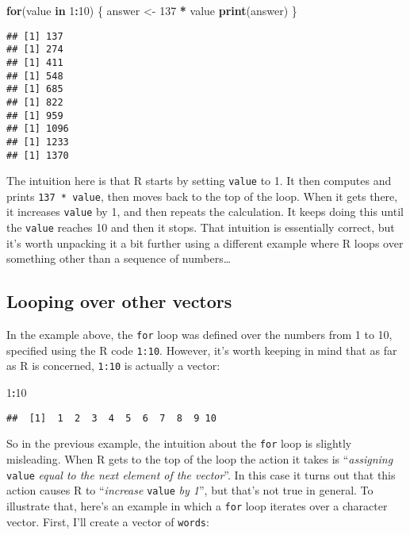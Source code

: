 \documentclass[]{book}
\newenvironment{Shaded}{\begin{snugshade}}{\end{snugshade}}
\newcommand{\ControlFlowTok}[1]{\textcolor[rgb]{0.13,0.29,0.53}{\textbf{#1}}}
\newcommand{\DecValTok}[1]{\textcolor[rgb]{0.00,0.00,0.81}{#1}}
\newcommand{\KeywordTok}[1]{\textcolor[rgb]{0.13,0.29,0.53}{\textbf{#1}}}
\newcommand{\NormalTok}[1]{#1}
\newcommand{\OperatorTok}[1]{\textcolor[rgb]{0.81,0.36,0.00}{\textbf{#1}}}
\newcommand{\StringTok}[1]{\textcolor[rgb]{0.31,0.60,0.02}{#1}}
\begin{document}
\begin{Shaded}
\begin{Highlighting}[]
\ControlFlowTok{for}\NormalTok{(value }\ControlFlowTok{in} \DecValTok{1}\OperatorTok{:}\DecValTok{10}\NormalTok{) \{}
\NormalTok{  answer <-}\StringTok{ }\DecValTok{137} \OperatorTok{*}\StringTok{ }\NormalTok{value}
  \KeywordTok{print}\NormalTok{(answer)}
\NormalTok{\}}
\end{Highlighting}
\end{Shaded}

\begin{verbatim}
## [1] 137
## [1] 274
## [1] 411
## [1] 548
## [1] 685
## [1] 822
## [1] 959
## [1] 1096
## [1] 1233
## [1] 1370
\end{verbatim}

The intuition here is that R starts by setting \texttt{value} to 1. It then computes and prints \texttt{137\ *\ value}, then moves back to the top of the loop. When it gets there, it increases \texttt{value} by 1, and then repeats the calculation. It keeps doing this until the \texttt{value} reaches 10 and then it stops. That intuition is essentially correct, but it's worth unpacking it a bit further using a different example where R loops over something other than a sequence of numbers\ldots{}

\hypertarget{looping-over-other-vectors}{%
\subsection{Looping over other vectors}\label{looping-over-other-vectors}}

In the example above, the \texttt{for} loop was defined over the numbers from 1 to 10, specified using the R code \texttt{1:10}. However, it's worth keeping in mind that as far as R is concerned, \texttt{1:10} is actually a vector:

\begin{Shaded}
\begin{Highlighting}[]
\DecValTok{1}\OperatorTok{:}\DecValTok{10}
\end{Highlighting}
\end{Shaded}

\begin{verbatim}
##  [1]  1  2  3  4  5  6  7  8  9 10
\end{verbatim}

So in the previous example, the intuition about the \texttt{for} loop is slightly misleading. When R gets to the top of the loop the action it takes is ``\emph{assigning} \texttt{value} \emph{equal to the next element of the vector}''. In this case it turns out that this action causes R to ``\emph{increase} \texttt{value} \emph{by 1}'', but that's not true in general. To illustrate that, here's an example in which a \texttt{for} loop iterates over a character vector. First, I'll create a vector of \texttt{words}:
\end{document}
